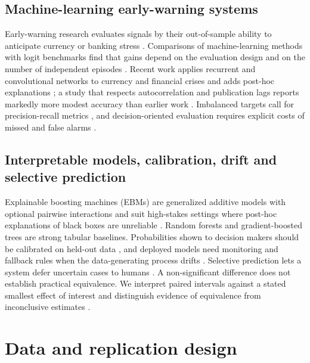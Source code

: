 \documentclass[preprint,12pt,authoryear]{elsarticle}
\begin{document}
\subsection{Machine-learning early-warning systems}
Early-warning research evaluates signals by their out-of-sample ability to anticipate currency or banking stress \citep{kaminsky1998,frankel1996}. Comparisons of machine-learning methods with logit benchmarks find that gains depend on the evaluation design and on the number of independent episodes \citep{holopainen2017,beutel2019,bluwstein2023}. Recent work applies recurrent and convolutional networks to currency and financial crises \citep{barthelemy2024,chen2024} and adds post-hoc explanations \citep{reimann2024}; a study that respects autocorrelation and publication lags reports markedly more modest accuracy than earlier work \citep{ostrensky2023}. Imbalanced targets call for precision-recall metrics \citep{saito2015}, and decision-oriented evaluation requires explicit costs of missed and false alarms \citep{elkan2001}.

\subsection{Interpretable models, calibration, drift and selective prediction}
Explainable boosting machines (EBMs) are generalized additive models with optional pairwise interactions \citep{lou2012,nori2019} and suit high-stakes settings where post-hoc explanations of black boxes are unreliable \citep{rudin2019}. Random forests \citep{breiman2001} and gradient-boosted trees \citep{chen2016} are strong tabular baselines. Probabilities shown to decision makers should be calibrated on held-out data \citep{platt1999,niculescu2005}, and deployed models need monitoring and fallback rules when the data-generating process drifts \citep{gama2014}. Selective prediction lets a system defer uncertain cases to humans \citep{chow1970,geifman2017}. A non-significant difference does not establish practical equivalence. We interpret paired intervals against a stated smallest effect of interest and distinguish evidence of equivalence from inconclusive estimates \citep{schuirmann1987,lakens2017}.

\section{Data and replication design}
\end{document}
